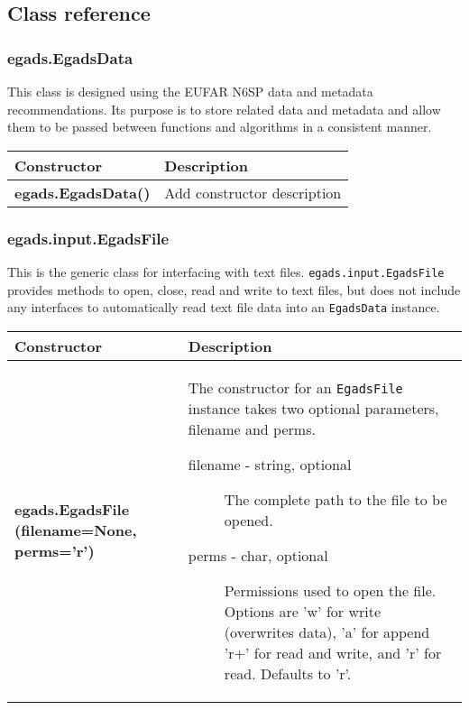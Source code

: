 \documentclass[a4paper,11pt]{report}
\begin{document}
\begin{appendix}

\chapter{Class reference}

\subsection{egads.EgadsData}

This class is designed using the EUFAR N6SP data and metadata recommendations. Its purpose is 
to store related data and metadata and allow them to be passed between functions and algorithms 
in a consistent manner.

\begin{table}[h]
\begin{tabular}{l p{10cm}}
\textbf{Constructor} & \textbf{Description}  \\ \hline
\textbf{egads.EgadsData()} & Add constructor description \\
\end{tabular}
\end{table}

\subsection{egads.input.EgadsFile}

This is the generic class for interfacing with text files. \verb|egads.input.EgadsFile| provides
methods to open, close, read and write to text files, but does not include any interfaces to automatically
read text file data into an \verb|EgadsData| instance.


\begin{table}[h]
\begin{tabular}{p{4cm} p{10cm}}
\textbf{Constructor} & \textbf{Description} \\ \hline
\textbf{egads.EgadsFile (filename=None, perms='r')} & The constructor for an \verb|EgadsFile| instance
takes two optional parameters, filename and perms.

\begin{description}
 \item[filename - string, optional]
 The complete path to the file to be opened.
 \item[perms - char, optional]
 Permissions used to open the file. Options are 'w' for write (overwrites
            data), 'a' for append 'r+' for read and write, and 'r' for read. Defaults to 'r'. 
\end{description}


\end{tabular}
\end{table}
\end{appendix}
\end{document}
